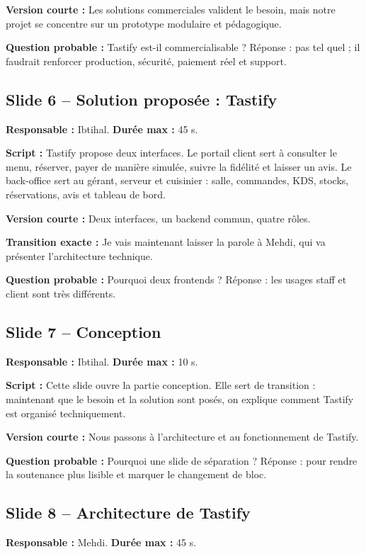 \documentclass[11pt,a4paper]{article}
\begin{document}
\textbf{Version courte :} Les solutions commerciales valident le besoin, mais notre projet se concentre sur un prototype modulaire et pédagogique.

\textbf{Question probable :} Tastify est-il commercialisable ? Réponse : pas tel quel ; il faudrait renforcer production, sécurité, paiement réel et support.

\subsection*{Slide 6 -- Solution proposée : Tastify}
\textbf{Responsable :} Ibtihal. \textbf{Durée max :} 45 s.

\textbf{Script :} Tastify propose deux interfaces. Le portail client sert à consulter le menu, réserver, payer de manière simulée, suivre la fidélité et laisser un avis. Le back-office sert au gérant, serveur et cuisinier : salle, commandes, KDS, stocks, réservations, avis et tableau de bord.

\textbf{Version courte :} Deux interfaces, un backend commun, quatre rôles.

\textbf{Transition exacte :} Je vais maintenant laisser la parole à Mehdi, qui va présenter l'architecture technique.

\textbf{Question probable :} Pourquoi deux frontends ? Réponse : les usages staff et client sont très différents.

\subsection*{Slide 7 -- Conception}
\textbf{Responsable :} Ibtihal. \textbf{Durée max :} 10 s.

\textbf{Script :} Cette slide ouvre la partie conception. Elle sert de transition : maintenant que le besoin et la solution sont posés, on explique comment Tastify est organisé techniquement.

\textbf{Version courte :} Nous passons à l'architecture et au fonctionnement de Tastify.

\textbf{Question probable :} Pourquoi une slide de séparation ? Réponse : pour rendre la soutenance plus lisible et marquer le changement de bloc.

\subsection*{Slide 8 -- Architecture de Tastify}
\textbf{Responsable :} Mehdi. \textbf{Durée max :} 45 s.
\end{document}
